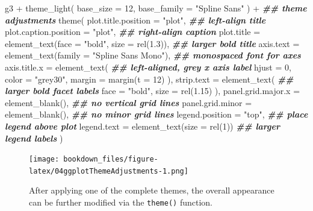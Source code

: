 \documentclass[
]{krantz}
\makeatletter
\newenvironment{Shaded}{\begin{snugshade}}{\end{snugshade}}
\newcommand{\AttributeTok}[1]{\textcolor[rgb]{0.61,0.61,0.61}{#1}}
\newcommand{\DecValTok}[1]{\textcolor[rgb]{0.06,0.06,0.06}{#1}}
\newcommand{\DocumentationTok}[1]{\textcolor[rgb]{0.37,0.37,0.37}{\textbf{\textit{#1}}}}
\newcommand{\FloatTok}[1]{\textcolor[rgb]{0.06,0.06,0.06}{#1}}
\newcommand{\FunctionTok}[1]{\textcolor[rgb]{0,0,0}{#1}}
\newcommand{\NormalTok}[1]{#1}
\newcommand{\SpecialCharTok}[1]{\textcolor[rgb]{0,0,0}{#1}}
\newcommand{\StringTok}[1]{\textcolor[rgb]{0.5,0.5,0.5}{#1}}
\newenvironment{kframe}{%
\medskip{}
\setlength{\fboxsep}{.8em}
 \def\at@end@of@kframe{}%
 \ifinner\ifhmode%
  \def\at@end@of@kframe{\end{minipage}}%
  \begin{minipage}{\columnwidth}%
 \fi\fi%
 \def\FrameCommand##1{\hskip\@totalleftmargin \hskip-\fboxsep
 \colorbox{shadecolor}{##1}\hskip-\fboxsep
     \hskip-\linewidth \hskip-\@totalleftmargin \hskip\columnwidth}%
 \MakeFramed {\advance\hsize-\width
   \@totalleftmargin\z@ \linewidth\hsize
   \@setminipage}}%
 {\par\unskip\endMakeFramed%
 \at@end@of@kframe}
\renewenvironment{Shaded}{\begin{kframe}}{\end{kframe}}
\makeatother
\begin{document}
\begin{Shaded}
\begin{Highlighting}[]
\NormalTok{g3 }\SpecialCharTok{+}
  \FunctionTok{theme\_light}\NormalTok{(}
    \AttributeTok{base\_size =} \DecValTok{12}\NormalTok{, }\AttributeTok{base\_family =} \StringTok{"Spline Sans"}
\NormalTok{  ) }\SpecialCharTok{+}
  \DocumentationTok{\#\# theme adjustments}
  \FunctionTok{theme}\NormalTok{(}
    \AttributeTok{plot.title.position =} \StringTok{"plot"}\NormalTok{, }\DocumentationTok{\#\# left{-}align title}
    \AttributeTok{plot.caption.position =} \StringTok{"plot"}\NormalTok{, }\DocumentationTok{\#\# right{-}align caption}
    \AttributeTok{plot.title =} \FunctionTok{element\_text}\NormalTok{(}\AttributeTok{face =} \StringTok{"bold"}\NormalTok{, }\AttributeTok{size =} \FunctionTok{rel}\NormalTok{(}\FloatTok{1.3}\NormalTok{)), }\DocumentationTok{\#\# larger bold title}
    \AttributeTok{axis.text =} \FunctionTok{element\_text}\NormalTok{(}\AttributeTok{family =} \StringTok{"Spline Sans Mono"}\NormalTok{), }\DocumentationTok{\#\# monospaced font for axes}
    \AttributeTok{axis.title.x =} \FunctionTok{element\_text}\NormalTok{( }\DocumentationTok{\#\# left{-}aligned, grey x axis label}
      \AttributeTok{hjust =} \DecValTok{0}\NormalTok{, }\AttributeTok{color =} \StringTok{"grey30"}\NormalTok{, }\AttributeTok{margin =} \FunctionTok{margin}\NormalTok{(}\AttributeTok{t =} \DecValTok{12}\NormalTok{)}
\NormalTok{    ),}
    \AttributeTok{strip.text =} \FunctionTok{element\_text}\NormalTok{( }\DocumentationTok{\#\# larger bold facet labels}
      \AttributeTok{face =} \StringTok{"bold"}\NormalTok{, }\AttributeTok{size =} \FunctionTok{rel}\NormalTok{(}\FloatTok{1.15}\NormalTok{)}
\NormalTok{    ),}
    \AttributeTok{panel.grid.major.x =} \FunctionTok{element\_blank}\NormalTok{(), }\DocumentationTok{\#\# no vertical grid lines}
    \AttributeTok{panel.grid.minor =} \FunctionTok{element\_blank}\NormalTok{(), }\DocumentationTok{\#\# no minor grid lines}
    \AttributeTok{legend.position =} \StringTok{"top"}\NormalTok{, }\DocumentationTok{\#\# place legend above plot}
    \AttributeTok{legend.text =} \FunctionTok{element\_text}\NormalTok{(}\AttributeTok{size =} \FunctionTok{rel}\NormalTok{(}\DecValTok{1}\NormalTok{)) }\DocumentationTok{\#\# larger legend labels}
\NormalTok{  )}
\end{Highlighting}
\end{Shaded}

\begin{figure}
\centering
\texttt{[image: bookdown\_files/figure-latex/04ggplotThemeAdjustments-1.png]}
\caption{\label{fig:04ggplotThemeAdjustments}After applying one of the complete themes, the overall appearance can be further modified via the \texttt{theme()} function.}
\end{figure}
\end{document}
